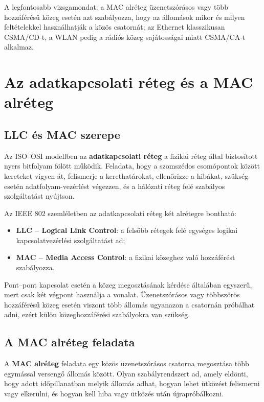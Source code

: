 A legfontosabb vizsgamondat: a MAC alréteg üzenetszórásos vagy több hozzáférésű közeg esetén azt szabályozza, hogy az állomások mikor és milyen feltételekkel használhatják a közös csatornát; az Ethernet klasszikusan CSMA/CD-t, a WLAN pedig a rádiós közeg sajátosságai miatt CSMA/CA-t alkalmaz.

\section{Az adatkapcsolati réteg és a MAC alréteg}

\subsection{LLC és MAC szerepe}

Az ISO--OSI modellben az \textbf{adatkapcsolati réteg} a fizikai réteg által biztosított nyers bitfolyam fölött működik. Feladata, hogy a szomszédos csomópontok között kereteket vigyen át, felismerje a kerethatárokat, ellenőrizze a hibákat, szükség esetén adatfolyam-vezérlést végezzen, és a hálózati réteg felé szabályos szolgáltatást nyújtson.

Az IEEE 802 szemléletben az adatkapcsolati réteg két alrétegre bontható:

\begin{itemize}
  \item \textbf{LLC -- Logical Link Control}: a felsőbb rétegek felé egységes logikai kapcsolatvezérlési szolgáltatást ad;
  \item \textbf{MAC -- Media Access Control}: a fizikai közeghez való hozzáférést szabályozza.
\end{itemize}

Pont--pont kapcsolat esetén a közeg megosztásának kérdése általában egyszerű, mert csak két végpont használja a vonalat. Üzenetszórásos vagy többszörös hozzáférésű közeg esetén viszont több állomás ugyanazon a csatornán próbálhat adni, ezért külön közeghozzáférési szabályokra van szükség.

\subsection{A MAC alréteg feladata}

A \textbf{MAC alréteg} feladata egy közös üzenetszórásos csatorna megosztása több egymással versengő állomás között. Olyan szabályrendszert ad, amely eldönti, hogy adott időpillanatban melyik állomás adhat, hogyan lehet ütközést felismerni vagy elkerülni, és hogyan kell hiba vagy ütközés után újrapróbálkozni.

